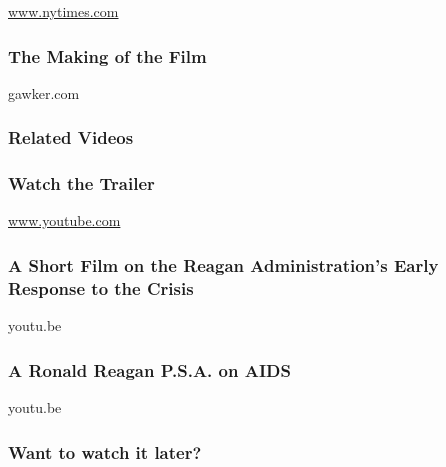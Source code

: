 \href{http://www.nytimes.com}{www.nytimes.com}

\href{http://gawker.com/5945317/how-to-survive-a-plague-how-to-make-an-uplifting-documentary-about-aids}{}

\hypertarget{the-making-of-the-film}{%
\subsubsection{The Making of the Film}\label{the-making-of-the-film}}

gawker.com

\hypertarget{related-videos}{%
\subsubsection{Related Videos}\label{related-videos}}

\href{https://www.youtube.com/watch?v=haEPLCA_H2Y}{}

\hypertarget{watch-the-trailer}{%
\subsubsection{Watch the Trailer}\label{watch-the-trailer}}

\href{http://www.youtube.com}{www.youtube.com}

\href{https://youtu.be/yAzDn7tE1lU}{}

\hypertarget{a-short-film-on-the-reagan-administrations-early-response-to-the-crisis}{%
\subsubsection{A Short Film on the Reagan Administration's Early
Response to the
Crisis}\label{a-short-film-on-the-reagan-administrations-early-response-to-the-crisis}}

youtu.be

\href{https://youtu.be/nI038QEP2MU}{}

\hypertarget{a-ronald-reagan-psa-on-aids}{%
\subsubsection{A Ronald Reagan P.S.A. on
AIDS}\label{a-ronald-reagan-psa-on-aids}}

youtu.be

\hypertarget{want-to-watch-it-later}{%
\subsubsection{Want to watch it later?}\label{want-to-watch-it-later}}

